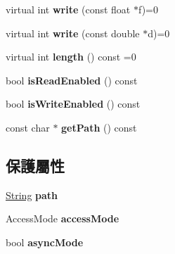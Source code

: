 \begin{DoxyCompactItemize}
\item 
virtual int {\bfseries write} (const float $\ast$f)=0\hypertarget{class_i_dream_sky_1_1_i_o_ae2405f8cbbd6251dec138286436bb14b}{}\label{class_i_dream_sky_1_1_i_o_ae2405f8cbbd6251dec138286436bb14b}

\item 
virtual int {\bfseries write} (const double $\ast$d)=0\hypertarget{class_i_dream_sky_1_1_i_o_a790c358a765bc0b1d49c7a7985484c62}{}\label{class_i_dream_sky_1_1_i_o_a790c358a765bc0b1d49c7a7985484c62}

\item 
virtual int {\bfseries length} () const  =0\hypertarget{class_i_dream_sky_1_1_i_o_a08008e733c3d51f1a252eda8f66bcc92}{}\label{class_i_dream_sky_1_1_i_o_a08008e733c3d51f1a252eda8f66bcc92}

\item 
bool {\bfseries is\+Read\+Enabled} () const \hypertarget{class_i_dream_sky_1_1_i_o_a9c3f4f8d7228777a1020307e254460d2}{}\label{class_i_dream_sky_1_1_i_o_a9c3f4f8d7228777a1020307e254460d2}

\item 
bool {\bfseries is\+Write\+Enabled} () const \hypertarget{class_i_dream_sky_1_1_i_o_ac3a9bd02f8d9e62d9524e2d887357d7f}{}\label{class_i_dream_sky_1_1_i_o_ac3a9bd02f8d9e62d9524e2d887357d7f}

\item 
const char $\ast$ {\bfseries get\+Path} () const \hypertarget{class_i_dream_sky_1_1_i_o_a9500060996c4b8077acd05bd40a926dc}{}\label{class_i_dream_sky_1_1_i_o_a9500060996c4b8077acd05bd40a926dc}

\end{DoxyCompactItemize}
\subsection*{保護屬性}
\begin{DoxyCompactItemize}
\item 
\hyperlink{class_i_dream_sky_1_1_string}{String} {\bfseries path}\hypertarget{class_i_dream_sky_1_1_i_o_a4f3cdf3eba6460e31ca81a3763177e43}{}\label{class_i_dream_sky_1_1_i_o_a4f3cdf3eba6460e31ca81a3763177e43}

\item 
Access\+Mode {\bfseries access\+Mode}\hypertarget{class_i_dream_sky_1_1_i_o_aa69530339dfa8aa055b09b3de08ac219}{}\label{class_i_dream_sky_1_1_i_o_aa69530339dfa8aa055b09b3de08ac219}

\item 
bool {\bfseries async\+Mode}\hypertarget{class_i_dream_sky_1_1_i_o_a182c19a45bd3fc249265318f0b9321a2}{}\label{class_i_dream_sky_1_1_i_o_a182c19a45bd3fc249265318f0b9321a2}

\end{DoxyCompactItemize}


